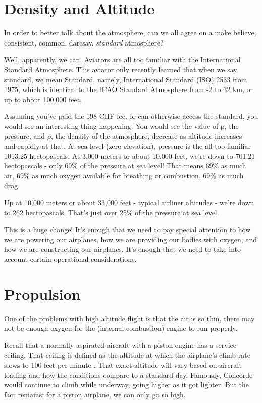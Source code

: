 \section{Density and Altitude}

In order to better talk about the atmosphere, can we all agree on a make believe, consistent, common, daresay, \emph{standard} atmosphere?

Well, apparently, we can. Aviators are all too familiar with the International Standard Atmosphere. This aviator only recently learned that when we say standard, we mean Standard, namely, International Standard (ISO) 2533 from 1975, which is identical to the ICAO Standard Atmosphere from -2 to 32 km, or up to about 100,000 feet.

Assuming you've paid the 198 CHF fee, or can otherwise access the standard, you would see an interesting thing happening. You would see the value of p, the pressure, and $\rho$, the density of the atmosphere, decrease as altitude increases - and rapidly at that. At sea level (zero elevation), pressure is the all too familiar 1013.25 hectopascals. At 3,000 meters or about 10,000 feet, we're down to 701.21 hectopascals - only 69\% of the pressure at sea level! That means 69\% as much air, 69\% as much oxygen available for breathing or combustion, 69\% as much drag.

Up at 10,000 meters or about 33,000 feet - typical airliner altitudes - we're down to 262 hectopascals. That's just over 25\% of the pressure at sea level.

This is a huge change! It's enough that we need to pay special attention to how we are powering our airplanes, how we are providing our bodies with oxygen, and how we are constructing our airplanes. It's enough that we need to take into account certain operational considerations.

\section{Propulsion}

One of the problems with high altitude flight is that the air is so thin, there may not be enough oxygen for the (internal combustion) engine to run properly.

Recall that a normally aspirated aircraft with a piston engine has a service ceiling. That ceiling is defined as the altitude at which the airplane's climb rate slows to 100 feet per minute \cite{marchman}. That exact altitude will vary based on aircraft loading and how the conditions compare to a standard day. Famously, Concorde would continue to climb while underway, going higher as it got lighter. But the fact remains: for a piston airplane, we can only go so high.

